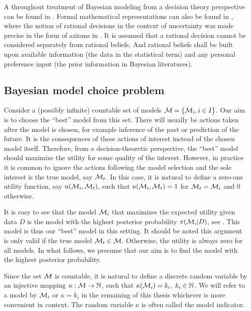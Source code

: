 \documentclass[11pt, hyper, bib, fontset=Minion]{marticle}
\begin{document}
A throughout treatment of Bayesian modeling from a decision theory perspective
can be found in \textcite{Robert:2007tc}. Formal mathematical representations
can also be found in \textcite[][sec.~5.1 and sec.~6.1]{Bernardo:1994vd},
where the notion of rational decisions in the context of uncertainty was made
precise in the form of axioms in \textcite[][chap.~2]{Bernardo:1994vd}. It is
assumed that a rational decision cannot be considered separately from rational
beliefs. And rational beliefs shall be built upon available information (the
data in the statistical term) and any personal preference input (the prior
information in Bayesian literatures).

\subsection{Bayesian model choice problem}
\label{sub:Bayesian model choice problem}

Consider a (possibly infinite) countable set of models $\mathcal{M} = \{\mathcal{M}_i,
i\in I\}$. Our aim is to choose the ``best'' model from this set. There will
usually be actions taken after the model is chosen, for example inference of
the past or prediction of the future. It is the consequences of these actions
of interest instead of the chosen model itself. Therefore, from a
decision-theoretic perspective, the ``best'' model should maximize the utility
for some quality of the interest. However, in practice it is common to ignore
the actions following the model selection and the sole interest is the true
model, say $\mathcal{M}_t$. In this case, it is natural to define a zero-one utility
function, say $u(\mathcal{M}_i,\mathcal{M}_t)$, such that $u(\mathcal{M}_i,\mathcal{M}_t) = 1$ for
$\mathcal{M}_t = \mathcal{M}_i$ and $0$ otherwise.

It is easy to see that the model $\mathcal{M}_i$ that maximizes the expected utility
given data $D$ is the model with the highest posterior probability
$\pi(\mathcal{M}_i|D)$, see \textcite[][chap.~6]{Bernardo:1994vd}. This model is
thus our ``best'' model in this setting. It should be noted this argument is
only valid if the true model $\mathcal{M}_t \in \mathcal{M}$. Otherwise, the utility is
always zero for all models. In what follows, we presume that our aim is to
find the model with the highest posterior probability.

Since the set $\mathcal{M}$ is countable, it is natural to define a discrete random
variable by an injective mapping $\kappa:\mathcal{M}\to\mathbb{N}$, such that
$\kappa(\mathcal{M}_i) = k_i$, $k_i \in \mathbb{N}$. We will refer to a model by $\mathcal{M}_i$
or $\kappa = k_i$ in the remaining of this thesis whichever is more convenient
in context. The random variable $\kappa$ is often called the model indicator.
\end{document}
